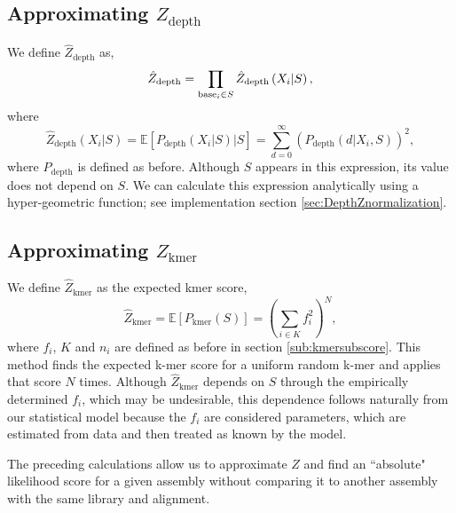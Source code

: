 \documentclass[phd,tocprelim]{cornell}
\begin{document}

\subsection{Approximating $Z_{\text{depth}}$} %
\label{sub:Aprroximating Z_depth}

We define $\hat{Z}_{\text{depth}}$ as,
\begin{equation}
    \hat{Z}_{\text{depth}} = \prod_{{\rm base}_{i} \in S} \hat{Z}_{\text{depth}} \left(X_{i}|S\right),
\end{equation}
where
\begin{equation}
    \hat{Z}_{\text{depth}} \left(X_{i}|S\right) = \mathbb{E}\left[P_{\text{depth}} \left(X_{i}|S\right)|S\right] = \sum_{d=0}^{\infty} \left(P_{\text{depth}}\left(d | X_{i}, S\right)\right)^{2},
\end{equation}
where $P_{\text{depth}}$ is defined as before. Although $S$ appears in this expression, its value does not depend on $S$. We can calculate this expression analytically using a hyper-geometric function; see implementation section \ref{sec:DepthZnormalization}.


\subsection{Approximating $Z_{\text{kmer}}$} %
\label{sub:Aprroximating Z_kmer}

We define $\hat{Z}_{\text{kmer}}$ as the expected kmer score,
\begin{equation}
    \hat{Z}_{\text{kmer}} = \mathbb{E}\left[P_{\text{kmer}}(S)\right] = \left(\sum_{i\in K} f_{i}^{2}\right)^{N},
\end{equation}
where $f_{i}$, $K$ and $n_{i}$ are defined as before in section \ref{sub:kmersubscore}. This method finds the expected k-mer score for a uniform random k-mer and applies that score $N$ times. Although $\hat{Z}_{\text{kmer}}$ depends on $S$ through the empirically determined $f_{i}$, which may be undesirable, this dependence follows naturally from our statistical model because the $f_{i}$ are considered parameters, which are estimated from data and then treated as known by the model. 


The preceding calculations allow us to approximate $Z$ and find an ``absolute" likelihood score for a given assembly without comparing it to another assembly with the same library and alignment.
\end{document}
